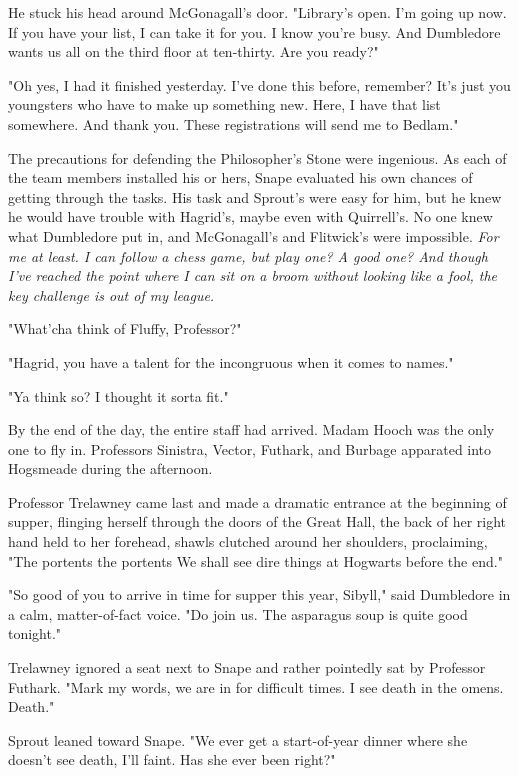 He stuck his head around McGonagall's door. "Library's open. I'm going up now. If you have your list, I can take it for you. I know you're busy. And Dumbledore wants us all on the third floor at ten-thirty. Are you ready?"

"Oh yes, I had it finished yesterday. I've done this before, remember? It's just you youngsters who have to make up something new. Here, I have that list somewhere. And thank you. These registrations will send me to Bedlam."

The precautions for defending the Philosopher's Stone were ingenious. As each of the team members installed his or hers, Snape evaluated his own chances of getting through the tasks. His task and Sprout's were easy for him, but he knew he would have trouble with Hagrid's, maybe even with Quirrell's. No one knew what Dumbledore put in, and McGonagall's and Flitwick's were impossible. \emph{For me at least. I can follow a chess game, but play one? A good one? And though I've reached the point where I can sit on a broom without looking like a fool, the key challenge is out of my league.}

"What'cha think of Fluffy, Professor?"

"Hagrid, you have a talent for the incongruous when it comes to names."

"Ya think so? I thought it sorta fit."

By the end of the day, the entire staff had arrived. Madam Hooch was the only one to fly in. Professors Sinistra, Vector, Futhark, and Burbage apparated into Hogsmeade during the afternoon.

Professor Trelawney came last and made a dramatic entrance at the beginning of supper, flinging herself through the doors of the Great Hall, the back of her right hand held to her forehead, shawls clutched around her shoulders, proclaiming, "The portents{\el} the portents{\el} We shall see dire things at Hogwarts before the end."

"So good of you to arrive in time for supper this year, Sibyll," said Dumbledore in a calm, matter-of-fact voice. "Do join us. The asparagus soup is quite good tonight."

Trelawney ignored a seat next to Snape and rather pointedly sat by Professor Futhark. "Mark my words, we are in for difficult times. I see death in the omens. Death."

Sprout leaned toward Snape. "We ever get a start-of-year dinner where she doesn't see death, I'll faint. Has she ever been right?"

